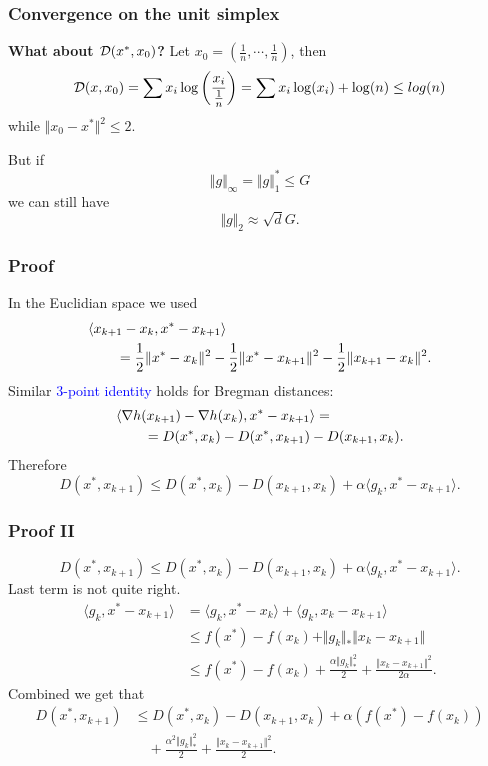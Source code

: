 \documentclass{beamer}
\begin{document}
\begin{frame}
  \frametitle{Convergence on the unit simplex}
    \textbf{What about $\mathcal{D}(x^*, x_0) $?}
    Let $x_0 = (\frac{1}{n}, \cdots , \frac{1}{n})$, then
    \begin{equation}
      \mathcal{D}(x, x_0) = \sum x_i \log\left(\frac{x_i}{\frac1n}\right) = \sum x_i \log(x_i) + \log(n) \le log(n)
    \end{equation}
    while $ \Vert x_0 - x^* \Vert^2 \le 2$.

    But if
    \begin{equation}
      \Vert g \Vert_\infty = \Vert g \Vert_1^* \le G
    \end{equation}
    we can still have
    \begin{equation}
      \Vert g \Vert_2 \approx \sqrt{d} G.
    \end{equation}
\end{frame}


\begin{frame}
  \frametitle{Proof}
  In the Euclidian space we used
  \begin{align}
    \MoveEqLeft \langle x_{k+1}-x_k, x^* -x_{k+1} \rangle \\
    &= \frac12 \Vert x^*-x_k \Vert^2 - \frac12 \Vert x^*-x_{k+1} \Vert^2 - \frac12 \Vert x_{k+1}-x_k \Vert^2.
  \end{align}
  Similar \textcolor{blue}{$3$-point identity} holds for Bregman distances:
  \begin{align}
    \MoveEqLeft \langle \nabla h(x_{k+1})-\nabla h(x_k), x^*-x_{k+1} \rangle =\\
    &= D(x^*, x_k) - D(x^*, x_{k+1}) - D(x_{k+1}, x_k).
  \end{align}
  Therefore
  \begin{equation}
    D(x^*, x_{k+1}) \le  D(x^*, x_k) - D(x_{k+1}, x_k) + \alpha \langle g_k, x^*-x_{k+1} \rangle.
  \end{equation}
\end{frame}


\begin{frame}
  \frametitle{Proof II}
  \begin{equation}
    D(x^*, x_{k+1}) \le  D(x^*, x_k) - D(x_{k+1}, x_k) + \alpha \langle g_k, x^*-x_{k+1} \rangle.
  \end{equation}
  Last term is not quite right.
  \begin{align}
    \langle g_k, x^*-x_{k+1} \rangle &= \langle g_k, x^*-x_k \rangle + \langle g_k, x_k-x_{k+1} \rangle \\
                         &\le f(x^*)-f(x_k) + \Vert g_k \Vert_* \Vert x_k-x_{k+1} \Vert \\
    &\le f(x^*)-f(x_k) + \frac{\alpha \Vert g_k \Vert_*^2}{2} + \frac{\Vert x_k-x_{k+1} \Vert^2}{2 \alpha}.
  \end{align}
  Combined we get that
  \begin{align}
    D(x^*, x_{k+1}) &\le  D(x^*, x_k) - D(x_{k+1}, x_k) + \alpha (f(x^*)-f(x_k)) \\
    &\quad+ \frac{\alpha^2 \Vert g_k \Vert_*^2}{2} + \frac{\Vert x_k-x_{k+1} \Vert^2}{2}.
  \end{align}
\end{frame}
\end{document}
